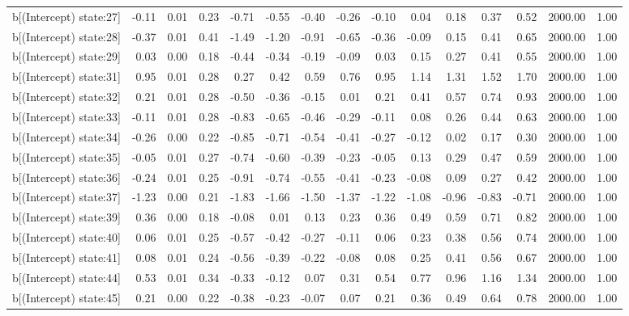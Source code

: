 \begin{table}[ht]
\begin{tabular}{rrrrrrrrrrrrrrr}
  b[(Intercept) state:27] & -0.11 & 0.01 & 0.23 & -0.71 & -0.55 & -0.40 & -0.26 & -0.10 & 0.04 & 0.18 & 0.37 & 0.52 & 2000.00 & 1.00 \\ 
  b[(Intercept) state:28] & -0.37 & 0.01 & 0.41 & -1.49 & -1.20 & -0.91 & -0.65 & -0.36 & -0.09 & 0.15 & 0.41 & 0.65 & 2000.00 & 1.00 \\ 
  b[(Intercept) state:29] & 0.03 & 0.00 & 0.18 & -0.44 & -0.34 & -0.19 & -0.09 & 0.03 & 0.15 & 0.27 & 0.41 & 0.55 & 2000.00 & 1.00 \\ 
  b[(Intercept) state:31] & 0.95 & 0.01 & 0.28 & 0.27 & 0.42 & 0.59 & 0.76 & 0.95 & 1.14 & 1.31 & 1.52 & 1.70 & 2000.00 & 1.00 \\ 
  b[(Intercept) state:32] & 0.21 & 0.01 & 0.28 & -0.50 & -0.36 & -0.15 & 0.01 & 0.21 & 0.41 & 0.57 & 0.74 & 0.93 & 2000.00 & 1.00 \\ 
  b[(Intercept) state:33] & -0.11 & 0.01 & 0.28 & -0.83 & -0.65 & -0.46 & -0.29 & -0.11 & 0.08 & 0.26 & 0.44 & 0.63 & 2000.00 & 1.00 \\ 
  b[(Intercept) state:34] & -0.26 & 0.00 & 0.22 & -0.85 & -0.71 & -0.54 & -0.41 & -0.27 & -0.12 & 0.02 & 0.17 & 0.30 & 2000.00 & 1.00 \\ 
  b[(Intercept) state:35] & -0.05 & 0.01 & 0.27 & -0.74 & -0.60 & -0.39 & -0.23 & -0.05 & 0.13 & 0.29 & 0.47 & 0.59 & 2000.00 & 1.00 \\ 
  b[(Intercept) state:36] & -0.24 & 0.01 & 0.25 & -0.91 & -0.74 & -0.55 & -0.41 & -0.23 & -0.08 & 0.09 & 0.27 & 0.42 & 2000.00 & 1.00 \\ 
  b[(Intercept) state:37] & -1.23 & 0.00 & 0.21 & -1.83 & -1.66 & -1.50 & -1.37 & -1.22 & -1.08 & -0.96 & -0.83 & -0.71 & 2000.00 & 1.00 \\ 
  b[(Intercept) state:39] & 0.36 & 0.00 & 0.18 & -0.08 & 0.01 & 0.13 & 0.23 & 0.36 & 0.49 & 0.59 & 0.71 & 0.82 & 2000.00 & 1.00 \\ 
  b[(Intercept) state:40] & 0.06 & 0.01 & 0.25 & -0.57 & -0.42 & -0.27 & -0.11 & 0.06 & 0.23 & 0.38 & 0.56 & 0.74 & 2000.00 & 1.00 \\ 
  b[(Intercept) state:41] & 0.08 & 0.01 & 0.24 & -0.56 & -0.39 & -0.22 & -0.08 & 0.08 & 0.25 & 0.41 & 0.56 & 0.67 & 2000.00 & 1.00 \\ 
  b[(Intercept) state:44] & 0.53 & 0.01 & 0.34 & -0.33 & -0.12 & 0.07 & 0.31 & 0.54 & 0.77 & 0.96 & 1.16 & 1.34 & 2000.00 & 1.00 \\ 
  b[(Intercept) state:45] & 0.21 & 0.00 & 0.22 & -0.38 & -0.23 & -0.07 & 0.07 & 0.21 & 0.36 & 0.49 & 0.64 & 0.78 & 2000.00 & 1.00 \\ 

\end{tabular}
\end{table}
